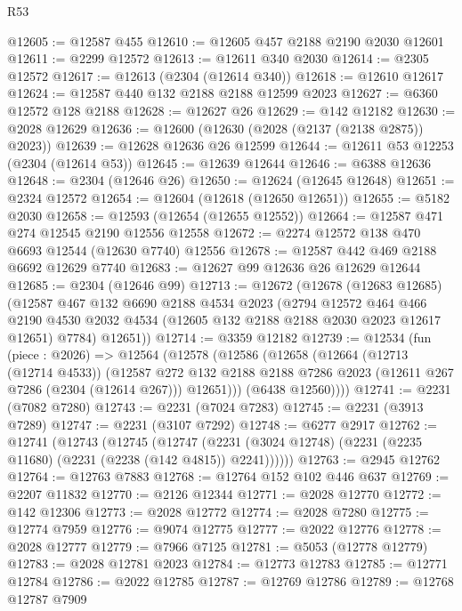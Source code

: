 \begin{lexlean}{R53}
\begin{coremodule}
@12605 := @12587 @455
@12610 := @12605 @457 @2188 @2190 @2030 @12601
@12611 := @2299 @12572
@12613 := @12611 @340 @2030
@12614 := @2305 @12572
@12617 := @12613 (@2304 (@12614 @340))
@12618 := @12610 @12617
@12624 := @12587 @440 @132 @2188 @2188 @12599 @2023
@12627 := @6360 @12572 @128 @2188
@12628 := @12627 @26
@12629 := @142 @12182
@12630 := @2028 @12629
@12636 := @12600 (@12630 (@2028 (@2137 (@2138 @2875)) @2023))
@12639 := @12628 @12636 @26 @12599
@12644 := @12611 @53 @12253 (@2304 (@12614 @53))
@12645 := @12639 @12644
@12646 := @6388 @12636
@12648 := @2304 (@12646 @26)
@12650 := @12624 (@12645 @12648)
@12651 := @2324 @12572
@12654 := @12604 (@12618 (@12650 @12651))
@12655 := @5182 @2030
@12658 := @12593 (@12654 (@12655 @12552))
@12664 := @12587 @471 @274 @12545 @2190 @12556 @12558
@12672 := @2274 @12572 @138 @470 @6693 @12544 (@12630 @7740) @12556
@12678 := @12587 @442 @469 @2188 @6692 @12629 @7740
@12683 := @12627 @99 @12636 @26 @12629 @12644
@12685 := @2304 (@12646 @99)
@12713 := @12672
    (@12678
      (@12683 @12685)
      (@12587
        @467
        @132
        @6690
        @2188
        @4534
        @2023
        (@2794
          @12572
          @464
          @466
          @2190
          @4530
          @2032
          @4534
          (@12605 @132 @2188 @2188 @2030 @2023 @12617 @12651)
          @7784)
        @12651))
@12714 := @3359 @12182
@12739 := @12534
    (fun (piece : @2026) =>
    @12564
      (@12578
        (@12586
          (@12658
            (@12664
              (@12713 (@12714 @4533))
              (@12587
                @272
                @132
                @2188
                @2188
                @7286
                @2023
                (@12611 @267 @7286 (@2304 (@12614 @267)))
                @12651)))
          (@6438 @12560))))
@12741 := @2231 (@7082 @7280)
@12743 := @2231 (@7024 @7283)
@12745 := @2231 (@3913 @7289)
@12747 := @2231 (@3107 @7292)
@12748 := @6277 @2917
@12762 := @12741
    (@12743
      (@12745
        (@12747 (@2231 (@3024 @12748) (@2231 (@2235 @11680) (@2231 (@2238 (@142 @4815)) @2241))))))
@12763 := @2945 @12762
@12764 := @12763 @7883
@12768 := @12764 @152 @102 @446 @637
@12769 := @2207 @11832
@12770 := @2126 @12344
@12771 := @2028 @12770
@12772 := @142 @12306
@12773 := @2028 @12772
@12774 := @2028 @7280
@12775 := @12774 @7959
@12776 := @9074 @12775
@12777 := @2022 @12776
@12778 := @2028 @12777
@12779 := @7966 @7125
@12781 := @5053 (@12778 @12779)
@12783 := @2028 @12781 @2023
@12784 := @12773 @12783
@12785 := @12771 @12784
@12786 := @2022 @12785
@12787 := @12769 @12786
@12789 := @12768 @12787 @7909

\end{coremodule}
\end{lexlean}
